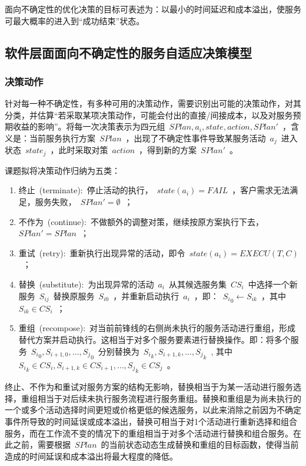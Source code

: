 面向不确定性的优化决策的目标可表述为：以最小的时间延迟和成本溢出，使服务可最大概率的进入到“成功结束”状态。

\subsection{软件层面面向不确定性的服务自适应决策模型}

\subsubsection{决策动作} \label{sec:action}

针对每一种不确定性，有多种可用的决策动作，需要识别出可能的决策动作，对其分类，并估算“若采取某项决策动作，可能会付出的直接/间接成本，以及对服务预期收益的影响”。将每一次决策表示为四元组~$SPlan,{a_i},state,action,SPlan'$~，含义是：当前服务执行方案~$SPlan$~，出现了不确定性事件导致某服务活动~$a_j$~进入状态~$state_j$~，此时采取对策~$action$~，得到新的方案~$SPlan'$~。

课题拟将决策动作归纳为五类：
\begin{enumerate}
\item 终止~(terminate):~停止活动的执行，~$state(a_i)=FAIL$~，客户需求无法满足，服务失败，~$SPlan'=\emptyset $~；
\item 不作为~(continue):~不做额外的调整对策，继续按原方案执行下去，~$SPlan'=SPlan$~；
\item 重试~(retry):~重新执行出现异常的活动，即令~$state(a_i)=EXECU(T, C)$~；
\item 替换~(substitute):~为出现异常的活动~$a_i$~从其候选服务集~$CS_i$~中选择一个新服务~$S_{ij}$~替换原服务~$S_{i0}$~，并重新启动执行~$a_i$~，即：~${S_i}_0 \leftarrow {S_{ik}}$~，其中~${S_{ik}} \in C{S_i}$~；
\item 重组~(recompose):~对当前前锋线的右侧尚未执行的服务活动进行重组，形成替代方案并启动执行。这相当于对多个服务要素进行替换操作。即：将多个服务~${S_i}_0,{S_{i + 1,0}}, \ldots ,{S_j}_0$~分别替换为~${S_i}_k,{S_{i + 1,k}}, \ldots ,{S_j}_k$~, 其中~${S_i}_k \in C{S_i},{S_{i + 1,k}} \in C{S_{i + 1}}, \ldots ,{S_j}_k \in C{S_j}$~。
\end{enumerate}

终止、不作为和重试对服务方案的结构无影响，替换相当于为某一活动进行服务选择，重组相当于对后续未执行服务流程进行服务重组。替换和重组是为尚未执行的一个或多个活动选择时间更短或价格更低的候选服务，以此来消除之前因为不确定事件所导致的时间延误或成本溢出，替换可相当于对1个活动进行重新选择和组合服务，而在工作流不变的情况下的重组相当于对多个活动进行替换和组合服务。在此之前，需要根据~$SPlan$~的当前状态动态生成替换和重组的目标函数，使得当前造成的时间延误和成本溢出将最大程度的降低。

